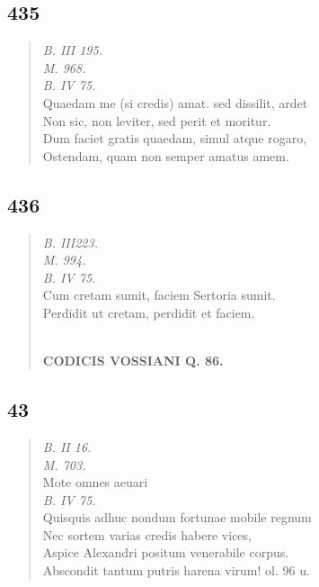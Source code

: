 \documentclass[11pt, a4paper]{report}
\begin{document}
            \subsection*{435}
      \begin{verse}
      \textit{B. III 195.} \\ \textit{M. 968.} \\ \textit{B. IV 75.} \\ Quaedam me (si credis) amat. sed dissilit, ardet \\ Non sic, non leviter, sed perit et moritur. \\ Dum faciet gratis quaedam, simul atque rogaro, \\ Ostendam, quam non semper amatus amem. \\ 
      \end{verse}
  
            \subsection*{436}
      \begin{verse}
      \textit{B. III223.} \\ \textit{M. 994.} \\ \textit{B. IV 75.} \\ Cum cretam sumit, faciem Sertoria sumit. \\ Perdidit  \lbrack ut \rbrack  cretam, perdidit et faciem. \\ 
        ﻿\pagebreak 
    \begin{center} \textbf{CODICIS VOSSIANI Q. 86.} \end{center} \marginpar{[331]} 
      \end{verse}
  
            \subsection*{43}
      \begin{verse}
      \textit{B. II 16.} \\ \textit{M. 703.} \\ Mote omnes aeuari \\ \textit{B. IV 75.} \\ Quisquis adhuc nondum fortunae mobile regnum \\ Nec sortem varias credis habere vices, \\ Aspice Alexandri positum venerabile corpus. \\ Abscondit tantum putris harena virum! ol. 96 u. \\ 
      \end{verse}
  
\end{document}
